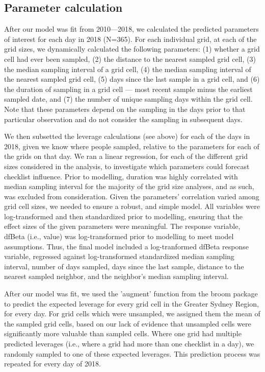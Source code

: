 \documentclass[9pt,twocolumn,twoside,lineno]{pnas-new}
\begin{document}
{\subsection*{Parameter calculation} After our model was fit from 2010---2018, we calculated the predicted parameters of interest for each day in 2018 (N=365). For each individual grid, at each of the grid sizes, we dynamically calculated the following parameters: (1) whether a grid cell had ever been sampled, (2) the distance to the nearest sampled grid cell, (3) the median sampling interval of a grid cell, (4) the median sampling interval of the nearest sampled grid cell, (5) days since the last sample in a grid cell, and (6) the duration of sampling in a grid cell --- most recent sample minus the earliest sampled date, and (7) the number of unique sampling days within the grid cell.  Note that  these parameters depend on the sampling in the days prior to that particular observation and do not consider the sampling in subsequent days.  

We then subsetted the leverage calculations (see above) for each of the days in 2018, given we know where people sampled, relative to the parameters for each of the grids on that day. We ran a linear regression, for each of the different grid sizes considered in the analysis, to investigate which parameters could forecast checklist influence. Prior to modelling, duration was highly correlated with median sampling interval for the majority of the grid size analyses, and as such, was excluded from consideration. Given the parameters' correlation varied among grid cell sizes, we needed to ensure a robust, and simple model. All variables were log-transformed and then standardized prior to modelling, ensuring that the effect sizes of the given parameters were meaningful. The response variable, dfBeta (i.e., value) was log-transformed prior to modelling to meet model assumptions. Thus, the final model included a log-tranformed dfBeta response variable, regressed against log-transformed standardized median sampling interval, number of days sampled, days since the last sample, distance to the nearest sampled neighbor, and the neighbor's median sampling interval.

After our model was fit, we used the 'augment' function from the broom package \cite{robinson2018broom} to predict the expected leverage for every grid cell in the Greater Sydney Region, for every day. For grid cells which were unsampled, we assigned them the mean of the sampled grid cells, based on our lack of evidence that unsampled cells were significantly more valuable than sampled cells. Where one grid had multiple predicted leverages (i.e., where a grid had more than one checklist in a day), we randomly sampled to one of these expected leverages. This prediction process was repeated for every day of 2018.

}
\end{document}
